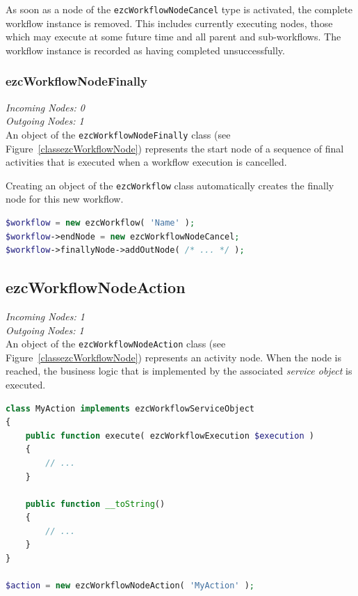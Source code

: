 As soon as a node of the \texttt{ezcWorkflowNodeCancel} type is activated, the
complete workflow instance is removed. This includes currently executing nodes,
those which may execute at some future time and all parent and sub-workflows.
The workflow instance is recorded as having completed unsuccessfully.

\subsubsection{ezcWorkflowNodeFinally}

\emph{Incoming Nodes: 0}\\
\emph{Outgoing Nodes: 1}\\

An object of the \texttt{ezcWorkflowNodeFinally} class (see
Figure~\ref{classezcWorkflowNode}) represents the start node of a sequence of
final activities that is executed when a workflow execution is cancelled.

Creating an object of the \texttt{ezcWorkflow} class automatically creates the
finally node for this new workflow.

\begin{lstlisting}[language=PHP]
$workflow = new ezcWorkflow( 'Name' );
$workflow->endNode = new ezcWorkflowNodeCancel;
$workflow->finallyNode->addOutNode( /* ... */ );
\end{lstlisting}

\subsection{ezcWorkflowNodeAction}

\emph{Incoming Nodes: 1}\\
\emph{Outgoing Nodes: 1}\\

An object of the \texttt{ezcWorkflowNodeAction} class (see
Figure~\ref{classezcWorkflowNode}) represents an activity node. When the node
is reached, the business logic that is implemented by the associated
\emph{service object} is executed.

\begin{lstlisting}[language=PHP]
class MyAction implements ezcWorkflowServiceObject
{
    public function execute( ezcWorkflowExecution $execution )
    {
        // ...
    }

    public function __toString()
    {
        // ...
    }
}

$action = new ezcWorkflowNodeAction( 'MyAction' );
\end{lstlisting}

